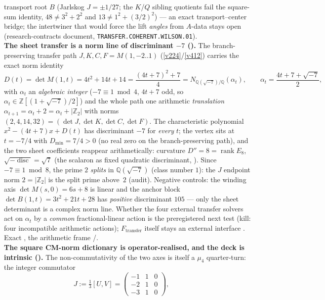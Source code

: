 \documentclass[11pt,a4paper]{article}
\newcommand{\Z}{\mathbb{Z}}
\theoremstyle{definition}
\begin{document}
\begin{keybox}
transport root $B$ (Jarlskog $J=\pm1/27$; the $K$/$Q$ sibling quotients fail the square-sum identity,
$48\neq3^2{+}2^2$ and $13\neq1^2{+}(3/2)^2$) --- an exact transport--center bridge; the intertwiner that
would force the lift \emph{angles} from $A$-data stays open (research-contracts document,
\texttt{TRANSFER.COHERENT.WILSON.01}).
\smallskip\\
\noindent\textbf{The sheet transfer is a norm line of discriminant $-7$
().} The branch-preserving transfer path $J,K,C,F=M(1,-2..1)$
(\vref{v224}/\vref{v412}) carries the exact norm identity
\[
  D(t)=\det M(1,t)=4t^2+14t+14=\frac{(4t+7)^2+7}{4}
      =N_{\mathbb Q(\sqrt{-7})/\mathbb Q}(\alpha_t),\qquad \alpha_t=\frac{4t+7+\sqrt{-7}}2,
\]
with $\alpha_t$ an \emph{algebraic integer} ($-7\equiv1\bmod4$, $4t{+}7$ odd, so
$\alpha_t\in\Z[(1{+}\sqrt{-7})/2]$) and the whole path one arithmetic \emph{translation}
$\alpha_{t+1}=\alpha_t+2=\alpha_t+|\Z_2|$ with norms $(2,4,14,32)=(\det J,\det K,\det C,\det F)$. The
characteristic polynomial $x^2-(4t{+}7)x+D(t)$ has discriminant $-7$ for \emph{every} $t$; the vertex sits
at $t=-7/4$ with $D_{\min}=7/4>0$ (no real zero on the branch-preserving path), and the two sheet
coefficients reappear arithmetically: curvature $D''=8=\operatorname{rank}E_8$, $\sqrt{-\operatorname{disc}}
=\sqrt7$ (the scalaron as fixed quadratic discriminant, \mC). Since $-7\equiv1\bmod 8$, the prime $2$
\emph{splits} in $\mathbb Q(\sqrt{-7})$ (class number $1$): the $J$ endpoint norm $2=|\Z_2|$ is the split prime
above~$2$ (audit). Negative controls: the winding axis $\det M(s,0)=6s{+}8$ is linear and the anchor block
$\det B(1,t)=3t^2{+}21t{+}28$ has \emph{positive} discriminant $105$ --- only the sheet determinant is a
complex norm line. Whether the four external transfer solvers act on $\alpha_t$ by a \emph{common}
fractional-linear action is the preregistered next test (kill: four incompatible arithmetic actions);
$F_{\mathrm{transfer}}$ itself stays an external interface \mO. Exact \mE, the arithmetic frame \mC/\mO.
\smallskip\\
\noindent\textbf{The square CM-norm dictionary is operator-realised, and the deck is intrinsic
().} The non-commutativity of the two axes is itself a $\mu_4$
quarter-turn: the integer commutator
\[
  J:=\tfrac13[U,V]=\begin{pmatrix}-1&1&0\\-2&1&0\\-3&1&0\end{pmatrix},\qquad
\]
\end{keybox}
\end{document}
